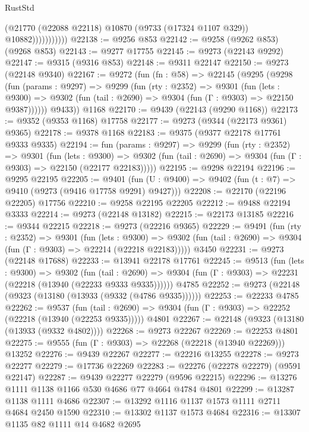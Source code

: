 \begin{lexlean}{RustStd}
\begin{coremodule}
                        (@21770 (@22088 @22118) @10870 (@9733 (@17324 @1107 @329)) @10882)))))))))))
@22138 := @9256 @853
@22142 := @9258 (@9262 @853) (@9268 @853)
@22143 := @9277 @17755
@22145 := @9273 (@22143 @9292)
@22147 := @9315 (@9316 @853)
@22148 := @9311 @22147
@22150 := @9273 (@22148 @9340)
@22167 := @9272
    (fun (fn : @58) =>
    @22145
      (@9295
        (@9298
          (fun (params : @9297) =>
          @9299
            (fun (rty : @2352) =>
            @9301
              (fun (lets : @9300) =>
              @9302 (fun (tail : @2690) => @9304 (fun (Γ : @9303) => @22150 @9387))))))
        @9433))
    @1168
@22170 := @9439 (@22143 (@9290 @1168))
@22173 := @9352 (@9353 @1168) @17758
@22177 := @9273 (@9344 (@22173 @9361) @9365)
@22178 := @9378 @1168
@22183 := @9375 (@9377 @22178 @17761 @9333 @9335)
@22194 := fun (params : @9297) =>
  @9299
    (fun (rty : @2352) =>
    @9301
      (fun (lets : @9300) =>
      @9302 (fun (tail : @2690) => @9304 (fun (Γ : @9303) => @22150 (@22177 @22183)))))
@22195 := @9298 @22194
@22196 := @9295 @22195
@22205 := @9401
    (fun (U : @9400) => @9402 (fun (t : @7) => @9410 (@9273 (@9416 @17758 @9291) @9427)))
@22208 := @22170 (@22196 @22205) @17756
@22210 := @9258 @22195 @22205
@22212 := @9488 @22194 @3333
@22214 := @9273 (@22148 @13182)
@22215 := @22173 @13185
@22216 := @9344 @22215
@22218 := @9273 (@22216 @9365)
@22229 := @9491
    (fun (rty : @2352) =>
    @9301
      (fun (lets : @9300) =>
      @9302 (fun (tail : @2690) => @9304 (fun (Γ : @9303) => @22214 (@22218 @22183)))))
    @3450
@22231 := @9273 (@22148 @17688)
@22233 := @13941 @22178 @17761
@22245 := @9513
    (fun (lets : @9300) =>
    @9302
      (fun (tail : @2690) =>
      @9304 (fun (Γ : @9303) => @22231 (@22218 (@13940 (@22233 @9333 @9335))))))
    @4785
@22252 := @9273 (@22148 (@9323 (@13180 (@13933 (@9332 (@4786 @9335))))))
@22253 := @22233 @4785
@22262 := @9537
    (fun (tail : @2690) => @9304 (fun (Γ : @9303) => @22252 (@22218 (@13940 (@22253 @9335)))))
    @4801
@22267 := @22148 (@9323 (@13180 (@13933 (@9332 @4802))))
@22268 := @9273 @22267
@22269 := @22253 @4801
@22275 := @9555 (fun (Γ : @9303) => @22268 (@22218 (@13940 @22269))) @13252
@22276 := @9439 @22267
@22277 := @22216 @13255
@22278 := @9273 @22277
@22279 := @17736 @22269
@22283 := @22276 (@22278 @22279) (@9591 @22147)
@22287 := @9439 @22277 @22279 (@9596 @22215)
@22296 := @13276 @1111 @1138 @1166 @530 @4686 @77 @4664 @4784 @4801
@22299 := @13287 @1138 @1111 @4686
@22307 := @13292 @1116 @1137 @1573 @1111 @2711 @4684 @2450 @1590
@22310 := @13302 @1137 @1573 @4684
@22316 := @13307 @1135 @82 @1111 @14 @4682 @2695

\end{coremodule}
\end{lexlean}
